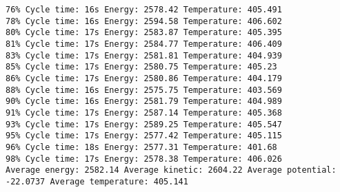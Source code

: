 \documentclass{article}
\begin{document}
\begin{verbatim}
76% Cycle time: 16s Energy: 2578.42 Temperature: 405.491
78% Cycle time: 16s Energy: 2594.58 Temperature: 406.602
80% Cycle time: 17s Energy: 2583.87 Temperature: 405.395
81% Cycle time: 17s Energy: 2584.77 Temperature: 406.409
83% Cycle time: 17s Energy: 2581.81 Temperature: 404.939
85% Cycle time: 17s Energy: 2580.75 Temperature: 405.23
86% Cycle time: 17s Energy: 2580.86 Temperature: 404.179
88% Cycle time: 16s Energy: 2575.75 Temperature: 403.569
90% Cycle time: 16s Energy: 2581.79 Temperature: 404.989
91% Cycle time: 17s Energy: 2587.14 Temperature: 405.368
93% Cycle time: 17s Energy: 2589.25 Temperature: 405.547
95% Cycle time: 17s Energy: 2577.42 Temperature: 405.115
96% Cycle time: 18s Energy: 2577.31 Temperature: 401.68
98% Cycle time: 17s Energy: 2578.38 Temperature: 406.026
Average energy: 2582.14 Average kinetic: 2604.22 Average potential: -22.0737 Average temperature: 405.141

    \end{verbatim}
\end{document}
